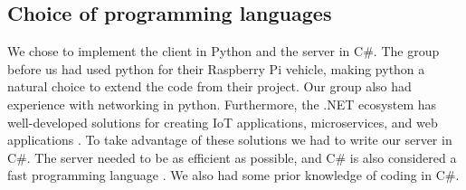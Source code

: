\subsection{Choice of programming languages}
We chose to implement the client in Python and the server in C\#. The group before us had used python for their Raspberry Pi vehicle, making python a natural choice to extend the code from their project. Our group also had experience with networking in python. Furthermore, the .NET ecosystem has well-developed solutions for creating IoT applications, microservices, and web applications \parencite{dotnet}. To take advantage of these solutions we had to write our server in C\#. The server needed to be as efficient as possible, and C\# is also considered a fast programming language \parencite{csharp}. We also had some prior knowledge of coding in C\#.